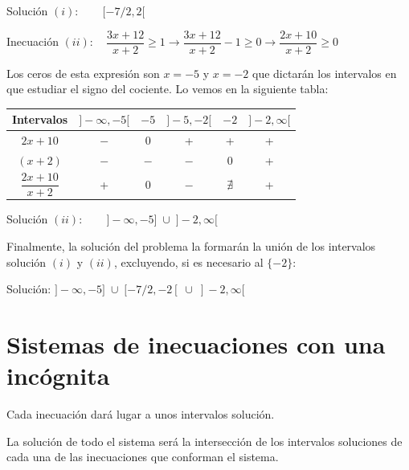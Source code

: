 \begin{miejercicio}
Solución $(i):\qquad [-7/2,2[$
			
\vspace{2mm} Inecuación $(ii): \quad \dfrac {3x+12}{x+2} \ge 1 \to \dfrac {3x+12}{x+2} -1\ge 0 \to \dfrac {2x+10}{x+2} \ge 0$	
			
\vspace{2mm} Los ceros de esta expresión son $x=-5$ y $x=-2$ que dictarán los intervalos en que estudiar el signo del cociente. Lo vemos en la siguiente tabla:
 				
 			\begin{table}[H]
 			\centering
			\begin{tabular}{|c|c|c|c|c|c|}
			\hline
 			Intervalos&$]-\infty,-5[$  &$-5$  &$]-5,-2[$  & $-2$ &$]-2,\infty[$ \\ \hline
 			$2x+10$& $-$ & 0 & + &+  & +\\ \hline
 			$(x+2)$& $-$ & $-$  & $-$  &0  & +\\ \hline
 			$\dfrac {2x+10}{x+2}$& + & 0 & $-$ & $\nexists$ & +\\ \hline
			\end{tabular}
			\end{table}
 			
 Solución $(ii):\qquad ]-\infty,-5]\;  \cup \;  ]-2,\infty[$
 			
 \vspace{2mm} Finalmente, la solución del problema la formarán la unión de los intervalos solución $(i)$ y $(ii)$, excluyendo, si es necesario al $\{ -2 \}$:
 			
\vspace{2mm}  Solución:  $]-\infty, -5] \; \cup\;  [-7/2, -2[ \; \cup\;  ]-2, \infty[$

\end{miejercicio}

\vspace{0.5cm}
\section{Sistemas de inecuaciones con una incógnita}
\vspace{0.5cm}

Cada inecuación dará lugar a unos intervalos solución. 

La solución de todo el sistema será la intersección de los intervalos soluciones de cada una de las inecuaciones que conforman el sistema.

